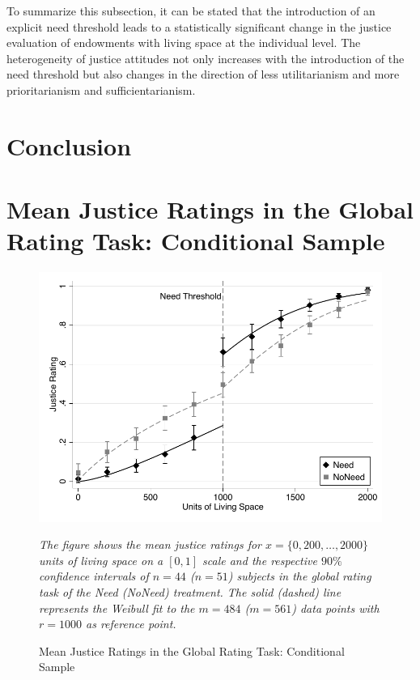 \documentclass[12pt]{scrartcl}
\begin{document}
To summarize this subsection, it can be stated that the introduction of an explicit need threshold leads to a statistically significant change in the justice evaluation of endowments with living space at the individual level.
The heterogeneity of justice attitudes not only increases with the introduction of the need threshold but also changes in the direction of less utilitarianism and more prioritarianism and sufficientarianism.


\section{Conclusion}\label{sec:conclusion}


\newpage




\newpage
\appendix
\section{Mean Justice Ratings in the Global Rating Task: Conditional Sample}\label{sec:app_conditional_absolute}
\begin{figure}[ht!]
   \centering
   \includegraphics{figures/figure_5.pdf}
   \begin{minipage}{\linewidth}
      \footnotesize
      \textit{The figure shows the mean justice ratings for $x=\{0,200,\ldots,2000\}$ units of living space on a $[0,1]$ scale and the respective $90\%$ confidence intervals of $n=44$ ($n=51$) subjects in the global rating task of the Need (NoNeed) treatment. The solid (dashed) line represents the Weibull fit to the $m=484$ ($m=561$) data points with $r=1000$ as reference point.}
   \end{minipage}
   \caption{Mean Justice Ratings in the Global Rating Task: Conditional Sample}
   \label{fig:global_ratings_conditional}
\end{figure}
\end{document}
